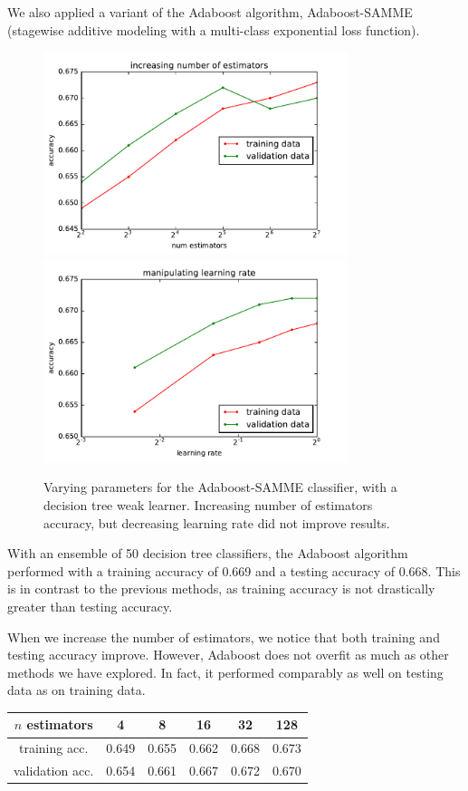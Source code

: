 \documentclass{article}
\begin{document}
\begin{multicols}{2}
We also applied a variant of the Adaboost algorithm,
Adaboost-SAMME (stagewise additive modeling
with a multi-class exponential loss function).

\begin{figure}[t]
   \centering
   \includegraphics[width=3.5in]{img/adaB-numEstimators.pdf}\hspace{-.1in}
   \includegraphics[width=3.5in]{img/adaB-learningRate.pdf}
   \caption{Varying parameters for the Adaboost-SAMME classifier,
   with a decision tree weak learner.
   Increasing number of estimators accuracy,
   but decreasing learning rate did not improve results.
   }
   \label{fig:adaB-params}
\end{figure}

With an ensemble of 50 decision tree classifiers,
the Adaboost algorithm performed with
a training accuracy of 0.669
and a testing accuracy of 0.668.
This is in contrast to the previous methods,
as training accuracy is not drastically greater than
testing accuracy.

When we increase the number of estimators,
we notice that both training and testing accuracy improve.
However, Adaboost does not overfit
as much as other methods we have explored.
In fact, it performed comparably as well on testing data
as on training data.

\begin{center}
    \begin{tabular}{c|ccccc}
        $n$ estimators &
          4 & 8 & 16 & 32 & 128 \\\hline
        training acc. &
          0.649 & 0.655 & 0.662 & 0.668 & 0.673\\
        validation acc. &
          0.654 & 0.661 & 0.667 & 0.672 &0.670
    \end{tabular}
\end{center}


\end{multicols}
\end{document}
